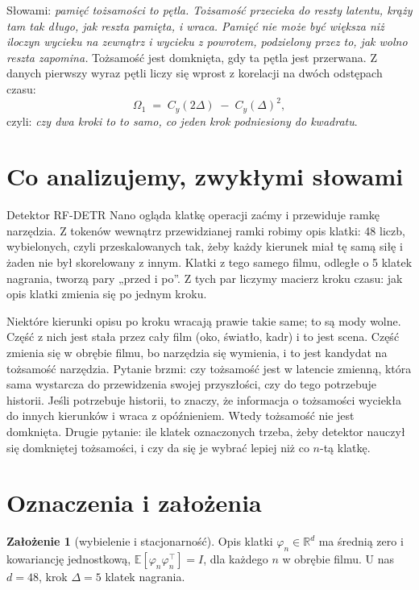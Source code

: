 \documentclass[11pt,a4paper]{article}
\theoremstyle{definition}
\newtheorem{zalozenie}{Założenie}
\theoremstyle{remark}
\newcommand{\E}{\mathbb{E}}
\newcommand{\R}{\mathbb{R}}
\newcommand{\T}{^{\top}}
\begin{document}
\medskip\noindent
Słowami: \emph{pamięć tożsamości to pętla. Tożsamość przecieka do reszty latentu, krąży tam tak długo,
jak reszta pamięta, i wraca. Pamięć nie może być większa niż iloczyn wycieku na zewnątrz i wycieku
z powrotem, podzielony przez to, jak wolno reszta zapomina.} Tożsamość jest domknięta, gdy ta pętla jest
przerwana. Z danych pierwszy wyraz pętli liczy się wprost z korelacji na dwóch odstępach czasu:
\begin{equation}\label{eq:omega1}
\Omega_1 \;=\; C_y(2\Delta) \;-\; C_y(\Delta)^2 ,
\end{equation}
czyli: \emph{czy dwa kroki to to samo, co jeden krok podniesiony do kwadratu}.

\section{Co analizujemy, zwykłymi słowami}

Detektor RF-DETR Nano ogląda klatkę operacji zaćmy i przewiduje ramkę narzędzia. Z tokenów wewnątrz
przewidzianej ramki robimy opis klatki: 48 liczb, wybielonych, czyli przeskalowanych tak, żeby każdy
kierunek miał tę samą siłę i żaden nie był skorelowany z innym. Klatki z tego samego filmu, odległe
o 5 klatek nagrania, tworzą pary „przed i po”. Z tych par liczymy macierz kroku czasu: jak opis klatki
zmienia się po jednym kroku.

Niektóre kierunki opisu po kroku wracają prawie takie same; to są mody wolne. Część z nich jest stała
przez cały film (oko, światło, kadr) i to jest scena. Część zmienia się w obrębie filmu, bo narzędzia się
wymienia, i to jest kandydat na tożsamość narzędzia. Pytanie brzmi: czy tożsamość jest w latencie zmienną,
która sama wystarcza do przewidzenia swojej przyszłości, czy do tego potrzebuje historii. Jeśli potrzebuje
historii, to znaczy, że informacja o tożsamości wyciekła do innych kierunków i wraca z opóźnieniem.
Wtedy tożsamość nie jest domknięta. Drugie pytanie: ile klatek oznaczonych trzeba, żeby detektor nauczył
się domkniętej tożsamości, i czy da się je wybrać lepiej niż co $n$-tą klatkę.

\section{Oznaczenia i założenia}\label{sec:oznaczenia}

\begin{zalozenie}[wybielenie i stacjonarność]\label{zal:biel}
Opis klatki $\varphi_n\in\R^d$ ma średnią zero i kowariancję jednostkową, $\E[\varphi_n\varphi_n\T]=I$,
dla każdego $n$ w obrębie filmu. U nas $d=48$, krok $\Delta = 5$ klatek nagrania.
\end{zalozenie}
\end{document}
